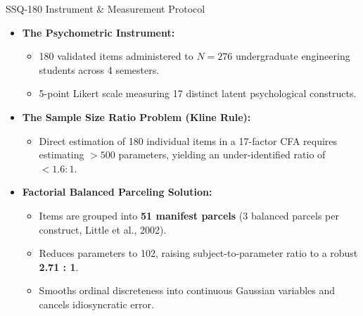\documentclass{beamer}
\begin{document}
\begin{frame}{SSQ-180 Instrument \& Measurement Protocol}
  \begin{itemize}\setlength{\itemsep}{8pt}
    \item \textbf{The Psychometric Instrument:}
    \begin{itemize}\setlength{\itemsep}{3pt}
      \item 180 validated items administered to $N = 276$ undergraduate engineering students across 4 semesters.
      \item 5-point Likert scale measuring 17 distinct latent psychological constructs.
    \end{itemize}
    
    \item \textbf{The Sample Size Ratio Problem (Kline Rule):}
    \begin{itemize}\setlength{\itemsep}{3pt}
      \item Direct estimation of 180 individual items in a 17-factor CFA requires estimating $> 500$ parameters, yielding an under-identified ratio of $< 1.6 : 1$.
    \end{itemize}
    
    \item \textbf{Factorial Balanced Parceling Solution:}
    \begin{itemize}\setlength{\itemsep}{3pt}
      \item Items are grouped into \textbf{51 manifest parcels} (3 balanced parcels per construct, Little et al., 2002).
      \item Reduces parameters to 102, raising subject-to-parameter ratio to a robust \textbf{2.71 : 1}.
      \item Smooths ordinal discreteness into continuous Gaussian variables and cancels idiosyncratic error.
    \end{itemize}
  \end{itemize}
\end{frame}
\end{document}
